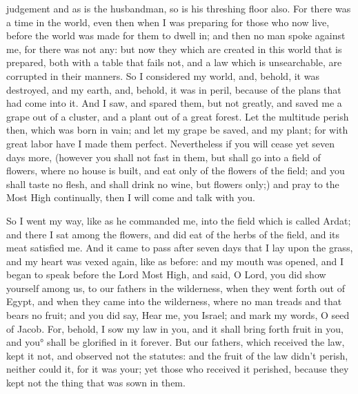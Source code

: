 {{} judgement
{} and as is the husbandman, so is his threshing floor also. For there was a time in the world,
even then when I was preparing for those who now live, before the world was made for them to dwell in; and then no man spoke against me,
for
 there was not any: but now they which are created in this world that is prepared, both
 with a table that fails not, and a law which is unsearchable, are corrupted in their manners.
So I considered my world, and, behold, it was destroyed, and my earth, and, behold, it was in peril, because of the plans that had come into it.
And I saw, and spared them, but not greatly, and saved me a grape out of a cluster, and a plant out of
 a great forest.
Let the multitude perish then, which was born in vain; and let my grape be saved, and my plant; for with great labor have I made them perfect.
Nevertheless if you will cease yet seven days more, (however you shall not fast in them,
but shall go into a field of flowers, where no house is built, and eat only of the flowers of the field; and you shall taste no flesh, and shall drink no wine, but
{} flowers only;)
and pray to the Most High continually, then I will come and talk with you.
\par }{\PP {}So I went my way, like as he commanded me, into the field which is called
 Ardat; and there I sat among the flowers, and did eat of the herbs of the field, and its meat satisfied me.
And it came to pass after seven days that I lay upon the grass, and my heart was vexed again, like as before:
and my mouth was opened, and I began to speak before the Lord Most High, and said,
O Lord, you did show yourself among us, to our fathers in the wilderness, when they went forth out of Egypt, and when they came into the wilderness, where no man treads and that bears no fruit;
and you did say, Hear me, you Israel; and mark my words, O seed of Jacob.
For, behold, I sow my law in you, and it shall bring forth fruit in you, and you° shall be glorified in it forever.
But our fathers, which received the law, kept it not, and observed not the statutes: and the fruit of the law didn’t perish, neither could it, for it was your;
yet those who received it perished, because they kept not the thing that was sown in them.
}
